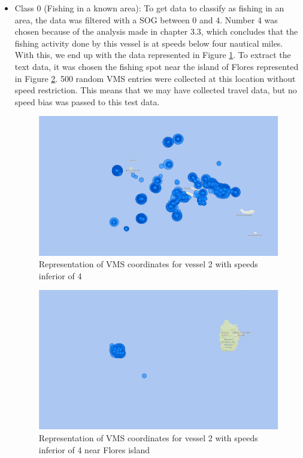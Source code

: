 \begin{itemize}
\item Class 0 (Fishing in a known area): To get data to classify as fishing in an area, the data was filtered with a SOG between 0 and 4. Number 4 was chosen because of the analysis made in chapter 3.3, which concludes that the fishing activity done by this vessel is at speeds below four nautical miles. With this, we end up with the data represented in Figure \ref{fig:bi_2_all}. To extract the text data, it was chosen the fishing spot near the island of Flores represented in Figure \ref{fig:bi_2_flores}. 500 random VMS entries were collected at this location without speed restriction. This means that we may have collected travel data, but no speed bias was passed to this test data. 


\begin{figure}[]
\centering
\includegraphics[width=0.8\linewidth]{Chapters/img/2fishingAll.pdf}
\caption{Representation of VMS coordinates for vessel 2 with speeds inferior of 4 }
\label{fig:bi_2_all}
\end{figure}

\begin{figure}[]
\centering
\includegraphics[width=0.8\linewidth]{Chapters/img/2fishing.pdf}
\caption{Representation of VMS coordinates for vessel 2 with speeds inferior of 4 near Flores island }
\label{fig:bi_2_flores}
\end{figure}


\end{itemize}
